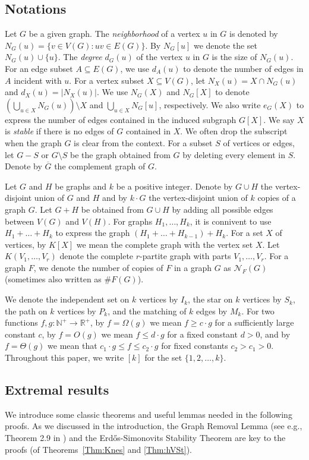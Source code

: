 \documentclass[10pt]{article}
\begin{document}
\subsection{Notations}
Let $G$ be a given graph.
The {\it neighborhood} of a vertex $u$ in $G$ is denoted by $N_G(u)=\{v\in V(G): uv\in E(G)\}$.
By $N_G[u]$ we denote the set $N_G(u)\cup\{u\}$.
The {\it degree} $d_{G}(u)$ of the vertex $u$ in $G$ is the size of $N_G(u)$.
For an edge subset $A\subseteq E(G)$, we use $d_A(u)$ to denote the number of edges in $A$ incident with $u$.
For a vertex subset $X\subseteq V(G)$, let $N_X(u)=X\cap N_G(u)$ and $d_X(u)=|N_X(u)|$.
We use $N_G(X)$ and $N_G[X]$ to denote $\left(\bigcup_{u\in X}N_G(u)\right)\setminus X$  and $\bigcup_{u\in X}N_G[u]$, respectively.
We also write $e_G(X)$ to express the number of edges contained in the induced subgraph $G[X]$.
We say $X$ is {\it stable} if there is no edges of $G$ contained in $X$.
We often drop the subscript when the graph $G$ is clear from the context.
For a subset $S$ of vertices or edges, let $G-S$ or $G\setminus S$ be the graph obtained from $G$ by deleting every element in $S$.
Denote by $\overline{G}$ the complement graph of $G$.

Let $G$ and $H$ be graphs and $k$ be a positive integer.
Denote by $G\cup H$ the vertex-disjoint union of $G$ and $H$ and by $k\cdot G$ the vertex-disjoint union of $k$ copies of a graph $G$.
Let $G+ H$ be obtained from $G\cup H$ by adding all possible edges between $V(G)$ and $V(H)$.
For graphs $H_1,\ldots,H_k$, it is connivent to use $H_1+\ldots+H_k$ to express the graph $(H_1+\ldots+H_{k-1})+H_k$.
For a set $X$ of vertices, by $K[X]$ we mean the complete graph with the vertex set $X$.
Let $K(V_1,\ldots,V_r)$ denote the complete $r$-partite graph with parts $V_1,\ldots,V_r$.
For a graph $F$, we denote the number of copies of $F$ in a graph $G$ as $\mathcal{N}_F(G)$ (sometimes also written as $\#F(G)$).


We denote the independent set on $k$ vertices by $I_k$,  the star on $k$ vertices by $S_{k}$, the path on $k$ vertices by $P_k$, and the matching of $k$ edges by $M_k$.
For two functions $f, g:\mathbb{N}^+\to \mathbb{R}^+$,
by $f=\Omega(g)$ we mean $f\geq c \cdot g$ for a sufficiently large constant $c$,
by $f=O(g)$ we mean $f\leq d\cdot g$ for a fixed constant $d>0$,
and by $f=\Theta(g)$ we mean that $c_1\cdot g\leq f\leq c_2 \cdot g$ for fixed constants $c_2>c_1>0$.
Throughout this paper, we write $[k]$ for the set $\{1,2,\ldots,k\}$.

\subsection{Extremal results}
We introduce some classic theorems and useful lemmas needed in the following proofs.
As we discussed in the introduction, 
the Graph Removal Lemma (see e.g., Theorem 2.9 in \cite{Komlos1996}) and the Erd\H{o}s-Simonovits Stability Theorem are key to the proofs (of Theorems~\ref{Thm:Knes} and \ref{Thm:hVSt}).
\end{document}
